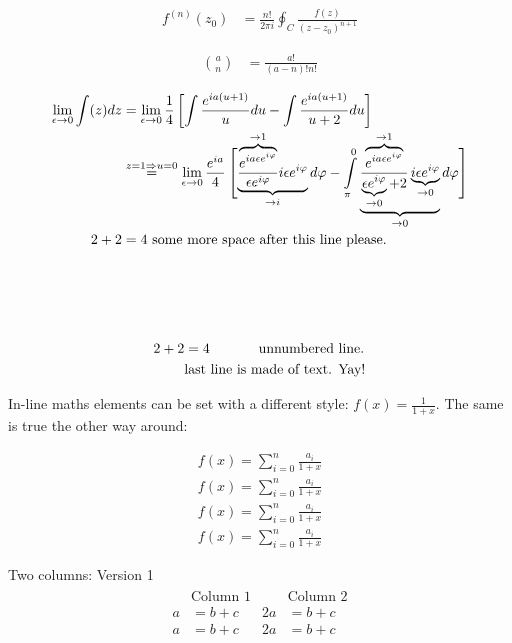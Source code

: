 \documentclass[12pt, a4paper, twopage]{scrartcl}
\newcommand{\limz}[1]{\lim\limits_{#1 \rightarrow 0}}	%
\begin{document}
\begin{align}
	 f^{(n)} (z_0) &= \frac{n!}{2\pi i} \oint_C  \frac{f(z)}{(z - z_0)^{n + 1}}
\end{align}


\begin{align}
	 \binom{a}{n} &= \frac{a!}{(a-n)! n!}
\end{align}


\begin{align}
	 \nonumber \limz{\epsilon}\int(z) dz &= \limz{\epsilon} \frac14 \left[ \int\frac{e^{ia(u + 1)}}{u} du - \int\frac{e^{ia(u + 1)}}{u + 2}du   \right]\\[1em]
	 & \overset{z = 1 \Rightarrow u = 0}= \limz{\epsilon} \frac{e^{i a}}{4} \left[\vphantom{ \int\limits_{\pi}^0} \smash{ \underbrace{\frac{\overbrace{e^{ia \epsilon e^{i \varphi}}}^{\rightarrow 1}} {\epsilon e^{i \varphi}} i \epsilon e^{i \varphi}}_{\rightarrow i}  d \varphi            - \int\limits_{\pi}^0 \underbrace{\frac{\overbrace{e^{ia \epsilon e^{i \varphi}}}^{\rightarrow 1}} {\underbrace{\epsilon e^{i \varphi}}_{\rightarrow 0} + 2} \underbrace{i \epsilon e^{i \varphi}}_{\rightarrow 0}}_{\rightarrow 0}  d \varphi  }\right]\\[2em]
	 2 + 2 &= 4 \ \text{some more space after this line please.}\\[4em]\nonumber
\end{align}


\begin{align}
	 \nonumber  2 + 2 &= 4 \text{ \hspace{1cm} unnumbered line.}\\
	 &\text{last line is made of text. Yay!}
\end{align}




In-line maths elements can be set with a different style: \(f(x) = \displaystyle \frac{1}{1+x}\). The same is true the other way around:

\begin{eqnarray*}
	f(x) = \sum_{i=0}^{n} \frac{a_i}{1+x} \\
	\textstyle f(x) = \textstyle \sum_{i=0}^{n} \frac{a_i}{1+x} \\
	\scriptstyle f(x) = \scriptstyle \sum_{i=0}^{n} \frac{a_i}{1+x} \\
	\scriptscriptstyle f(x) = \scriptscriptstyle \sum_{i=0}^{n} \frac{a_i}{1+x}
\end{eqnarray*}


Two columns: Version 1
\begin{align}
	\begin{split}
		&\text{Column 1}\\
		a &= b+c\\
		a &= b+c\\
	\end{split}
	\begin{split}
		& \text{Column 2}\\
		2a &= b+c\\
		2a &= b+c\\
	\end{split}
\end{align}
\end{document}
